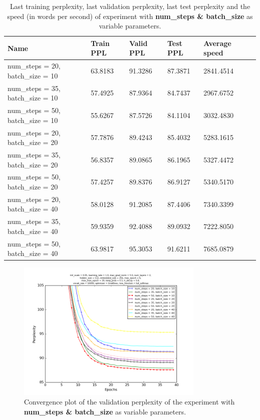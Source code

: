 \documentclass[10pt,a4paper,titlepage]{article}
\begin{document}
\begin{table}[H]
\centering
\caption{Last training perplexity, last validation perplexity, last test perplexity and the speed (in words per second) of experiment with \textbf{num\_steps \& batch\_size} as variable parameters.}
\label{tab:exp6data}
\begin{tabular}{|l|l|l|l|l|l|}
\hline
{\small Name} & {\small Train PPL} & {\small Valid PPL} & {\small Test PPL} & {\small Average speed}\\ \hline
{\small num\_steps = 20, batch\_size = 10}               & 63.8183    & 91.3286    & 87.3871    & 2841.4514  \\ \hline
{\small num\_steps = 35, batch\_size = 10}               & 57.4925    & 87.9364    & 84.7437    & 2967.6752  \\ \hline
{\small num\_steps = 50, batch\_size = 10}               & 55.6267    & 87.5726    & 84.1104    & 3032.4830  \\ \hline
{\small num\_steps = 20, batch\_size = 20}               & 57.7876    & 89.4243    & 85.4032    & 5283.1615  \\ \hline
{\small num\_steps = 35, batch\_size = 20}               & 56.8357    & 89.0865    & 86.1965    & 5327.4472  \\ \hline
{\small num\_steps = 50, batch\_size = 20}               & 57.4257    & 89.8376    & 86.9127    & 5340.5170  \\ \hline
{\small num\_steps = 20, batch\_size = 40}               & 58.0128    & 91.2085    & 87.4406    & 7340.3399  \\ \hline
{\small num\_steps = 35, batch\_size = 40}               & 59.9359    & 92.4088    & 89.0932    & 7222.8050  \\ \hline
{\small num\_steps = 50, batch\_size = 40}               & 63.9817    & 95.3053    & 91.6211    & 7685.0879  \\ \hline
\end{tabular}
\end{table}

\begin{figure}[H]
	\begin{center}
		\includegraphics[width=0.80\textwidth]{Figures/numstepsbatchperf.png}
		\caption{Convergence plot of the validation perplexity of the experiment with \textbf{num\_steps \& batch\_size} as variable parameters. }
		\label{fig:exp6perf}
	\end{center}	
\end{figure}
\end{document}
